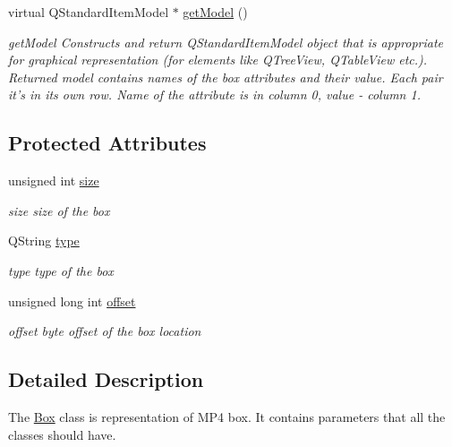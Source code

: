\begin{DoxyCompactItemize}
virtual Q\-Standard\-Item\-Model $\ast$ \hyperlink{class_box_a5c7911f3c88eec77383c0a464979807d}{get\-Model} ()
\begin{DoxyCompactList}\small\item\em get\-Model Constructs and return Q\-Standard\-Item\-Model object that is appropriate for graphical representation (for elements like Q\-Tree\-View, Q\-Table\-View etc.). Returned model contains names of the box attributes and their value. Each pair it's in its own row. Name of the attribute is in column 0, value -\/ column 1. \end{DoxyCompactList}\end{DoxyCompactItemize}
\subsection*{Protected Attributes}
\begin{DoxyCompactItemize}
\item 
\hypertarget{class_box_a0c055cb66d94b40d80e8a18d3d52d230}{unsigned int \hyperlink{class_box_a0c055cb66d94b40d80e8a18d3d52d230}{size}}\label{class_box_a0c055cb66d94b40d80e8a18d3d52d230}

\begin{DoxyCompactList}\small\item\em size size of the box \end{DoxyCompactList}\item 
\hypertarget{class_box_a7222d6793ebff6bd17192a5c5740a78b}{Q\-String \hyperlink{class_box_a7222d6793ebff6bd17192a5c5740a78b}{type}}\label{class_box_a7222d6793ebff6bd17192a5c5740a78b}

\begin{DoxyCompactList}\small\item\em type type of the box \end{DoxyCompactList}\item 
\hypertarget{class_box_a02478afe7796308689a7929a5d17cd3d}{unsigned long int \hyperlink{class_box_a02478afe7796308689a7929a5d17cd3d}{offset}}\label{class_box_a02478afe7796308689a7929a5d17cd3d}

\begin{DoxyCompactList}\small\item\em offset byte offset of the box location \end{DoxyCompactList}\end{DoxyCompactItemize}


\subsection{Detailed Description}
The \hyperlink{class_box}{Box} class is representation of M\-P4 box. It contains parameters that all the classes should have. 

